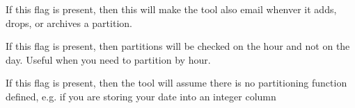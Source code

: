 \documentclass[letterpaper,10pt,english]{sphinxmanual}
\begin{document}
\begin{fulllineitems}
\label{\detokenize{mariadb-parted-fat:cmdoption-mariadb-parted-fat-email-activity}}
If this flag is present, then this will make the tool also email
whenver it adds, drops, or archives a partition.

\end{fulllineitems}


\begin{fulllineitems}
\label{\detokenize{mariadb-parted-fat:cmdoption-mariadb-parted-fat-use-hours}}
If this flag is present, then partitions will be checked on the hour and not on the day.
Useful when you need to partition by hour.

\end{fulllineitems}


\begin{fulllineitems}
\label{\detokenize{mariadb-parted-fat:cmdoption-mariadb-parted-fat-partcol-integer}}
If this flag is present, then the tool will assume there is no partitioning function
defined, e.g. if you are storing your date into an integer column

\end{fulllineitems}
\end{document}
